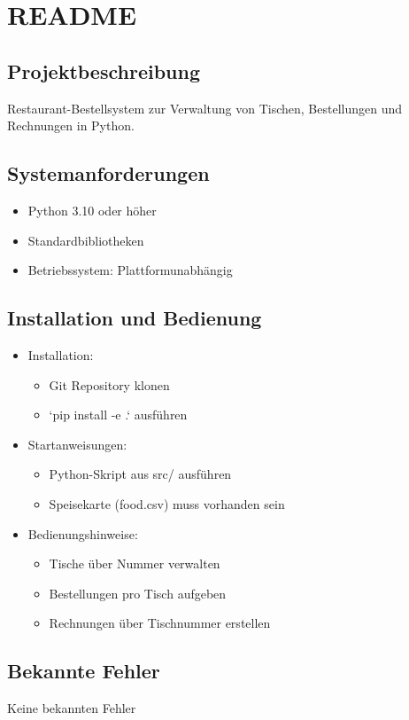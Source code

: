 \documentclass[a4paper,11pt]{article}
\begin{document}
\section{README}
\subsection{Projektbeschreibung}
Restaurant-Bestellsystem zur Verwaltung von Tischen, Bestellungen und Rechnungen in Python.

\subsection{Systemanforderungen}
\begin{itemize}
    \item Python 3.10 oder höher
    \item Standardbibliotheken
    \item Betriebssystem: Plattformunabhängig
\end{itemize}

\subsection{Installation und Bedienung}
\begin{itemize}
    \item Installation: 
    \begin{itemize}
        \item Git Repository klonen
        \item `pip install -e .` ausführen
    \end{itemize}
    \item Startanweisungen:
    \begin{itemize}
        \item Python-Skript aus src/ ausführen
        \item Speisekarte (food.csv) muss vorhanden sein
    \end{itemize}
    \item Bedienungshinweise:
    \begin{itemize}
        \item Tische über Nummer verwalten
        \item Bestellungen pro Tisch aufgeben
        \item Rechnungen über Tischnummer erstellen
    \end{itemize}
\end{itemize}

\subsection{Bekannte Fehler}
Keine bekannten Fehler
\end{document}
